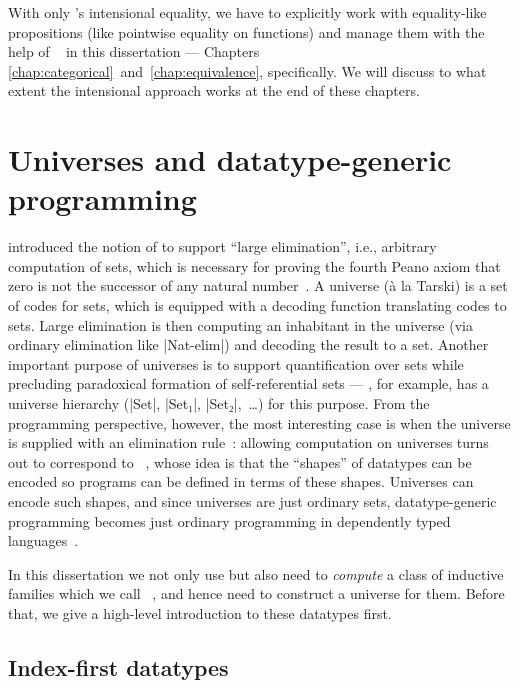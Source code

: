 With only \Agda's intensional equality, we have to explicitly work with equality-like propositions (like pointwise equality on functions) and manage them with the help of ~\citep{Barthe-setoids} in this dissertation --- Chapters \ref{chap:categorical}~and~\ref{chap:equivalence}, specifically.
We will discuss to what extent the intensional approach works at the end of these chapters.

\section{Universes and datatype-generic programming}
\label{sec:universes}

\citet{ML-TT84} introduced the notion of  to support ``large elimination'', i.e., arbitrary computation of sets, which is necessary for proving the fourth Peano axiom that zero is not the successor of any natural number~\citep{Smith-independence-fourth-axiom}.
A universe (à la Tarski) is a set of codes for sets, which is equipped with a decoding function translating codes to sets.
Large elimination is then computing an inhabitant in the universe (via ordinary elimination like |Nat-elim|) and decoding the result to a set.
Another important purpose of universes is to support quantification over sets while precluding paradoxical formation of self-referential sets --- \Agda, for example, has a universe hierarchy (|Set|, |Set₁|, |Set₂|,~\ldots\!) for this purpose.
From the programming perspective, however, the most interesting case is when the universe is supplied with an elimination rule~\citep[Section~14.2]{Nordstrom-programming}: allowing computation on universes turns out to correspond to ~\citep{Gibbons-DGP}, whose idea is that the ``shapes'' of datatypes can be encoded so programs can be defined in terms of these shapes.
Universes can encode such shapes, and since universes are just ordinary sets, datatype-generic programming becomes just ordinary programming in dependently typed languages~\citep{Altenkirch-GP-within-DTP}.

In this dissertation we not only use but also need to \emph{compute} a class of inductive families which we call ~\citep{Chapman-levitation, Dagand-functional-ornaments}, and hence need to construct a universe for them.
Before that, we give a high-level introduction to these datatypes first.

\subsection{Index-first datatypes}
\label{sec:index-first-datatypes}

